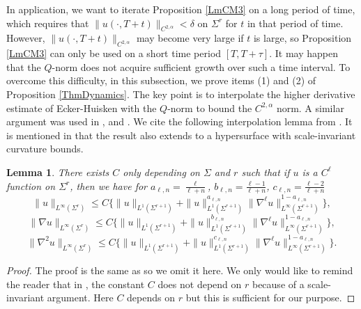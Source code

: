 \documentclass[12pt]{amsart}
\numberwithin{equation}{section}
\newtheorem{lemma}[theorem]{Lemma}
\numberwithin{equation}{section}
\newcommand{\dt}{\delta}
\newcommand{\al}{\alpha}
\begin{document}
	In application, we want to iterate Proposition \ref{LmCM3} on a long period of time, which requires that  $\|u(\cdot,T+t)\|_{C^{2,\al}}<\dt$ on $\Sigma^r$ for $t$ in that period of time. However, $\|u(\cdot,T+t)\|_{C^{2,\al}}$ may become very large if $t$ is large, so Proposition \ref{LmCM3} can only be used on a short time period $[T,T+\tau]$. It may happen that
	the $Q$-norm does not acquire sufficient growth over such a time interval. To overcome this difficulty, in this subsection, we prove items (1) and (2) of Proposition \ref{ThmDynamics}. The key point is to interpolate the higher derivative estimate of Ecker-Huisken with the $Q$-norm to bound the $C^{2,\al}$ norm. A similar argument was used in \cite{Sc}, \cite{CM3} and \cite{CS}. We cite the following interpolation lemma from 
	\cite[Appendix B]{CM3}. It is mentioned in \cite[Appendix B]{CM3} that the result also extends to a hypersurface with scale-invariant curvature bounds. 
	\begin{lemma}\label{LmCMinter}
		There exists $C$ only depending on $\Sigma$ and $r$ such that if $u$ is a $C^\ell$ function on $\Sigma^r$, then  we have for $a_{\ell,n}=\frac{\ell}{\ell+n}$, $b_{\ell,n}=\frac{\ell-1}{\ell+n}$, $c_{\ell,n}=\frac{\ell-2}{\ell+n}$
		\begin{equation*}
			\|u\|_{L^\infty(\Sigma^r)}\leq C\{\|u\|_{L^1(\Sigma^{r+1})}+\|u\|_{L^1(\Sigma^{r+1})}^{a_{\ell,n}} \|\nabla^\ell u \|^{1-a_{\ell,n}}_{L^\infty(\Sigma^{r+1})}\},
		\end{equation*}
		\begin{equation*}
			\|\nabla u\|_{L^\infty(\Sigma^r)}\leq C\{\|u\|_{L^1(\Sigma^{r+1})}+\|u\|_{L^1(\Sigma^{r+1})}^{b_{\ell,n}} \|\nabla^\ell u \|^{1-a_{\ell,n}}_{L^\infty(\Sigma^{r+1})}\},
		\end{equation*}
		\begin{equation*}
			\|\nabla^2u\|_{L^\infty(\Sigma^r)}\leq C\{\|u\|_{L^1(\Sigma^{r+1})}+\|u\|_{L^1(\Sigma^{r+1})}^{c_{\ell,n}} \|\nabla^\ell u \|^{1-a_{\ell,n}}_{L^\infty(\Sigma^{r+1})}\}.
		\end{equation*}
	\end{lemma}
	
	\begin{proof}
		The proof is the same as \cite[Appendix B]{CM3} so we omit it here. We only would like to remind the reader that in \cite[Appendix B]{CM3}, the constant $C$ does not depend on $r$ because of a scale-invariant argument. Here $C$ depends on $r$ but this is sufficient for our purpose.
	\end{proof}
	
\end{document}

